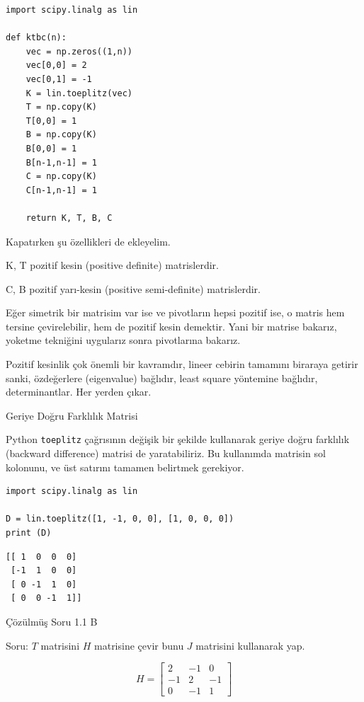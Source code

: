 \documentclass[12pt,fleqn]{article}\usepackage{../../common}
\begin{document}
\begin{verbatim}
import scipy.linalg as lin

def ktbc(n):
    vec = np.zeros((1,n))
    vec[0,0] = 2
    vec[0,1] = -1
    K = lin.toeplitz(vec)
    T = np.copy(K)
    T[0,0] = 1
    B = np.copy(K)
    B[0,0] = 1
    B[n-1,n-1] = 1
    C = np.copy(K)
    C[n-1,n-1] = 1
    
    return K, T, B, C
\end{verbatim}

Kapatırken şu özellikleri de ekleyelim. 

K, T pozitif kesin (positive definite) matrislerdir. 

C, B pozitif yarı-kesin (positive semi-definite) matrislerdir. 

Eğer simetrik bir matrisim var ise ve pivotların hepsi pozitif ise, o
matris hem tersine çevirelebilir, hem de pozitif kesin demektir. Yani bir
matrise bakarız, yoketme tekniğini uygularız sonra pivotlarına bakarız. 

Pozitif kesinlik çok önemli bir kavramdır, lineer cebirin tamamını biraraya
getirir sanki, özdeğerlere (eigenvalue) bağlıdır, least square yöntemine
bağlıdır, determinantlar. Her yerden çıkar. 

Geriye Doğru Farklılık Matrisi

Python \verb!toeplitz! çağrısının değişik bir şekilde kullanarak geriye
doğru farklılık (backward difference) matrisi de yaratabiliriz. Bu
kullanımda matrisin sol kolonunu, ve üst satırını tamamen belirtmek
gerekiyor.

\begin{verbatim}
import scipy.linalg as lin

D = lin.toeplitz([1, -1, 0, 0], [1, 0, 0, 0])
print (D)
\end{verbatim}

\begin{verbatim}
[[ 1  0  0  0]
 [-1  1  0  0]
 [ 0 -1  1  0]
 [ 0  0 -1  1]]
\end{verbatim}

Çözülmüş Soru 1.1 B

Soru: $T$ matrisini $H$ matrisine çevir bunu $J$ matrisini kullanarak
yap. 

$$ H = 
\left[\begin{array}{rrr}
2 & -1 &  0\\
-1 & 2 & -1\\
0 & -1 & 1
\end{array}\right]
 $$
\end{document}
